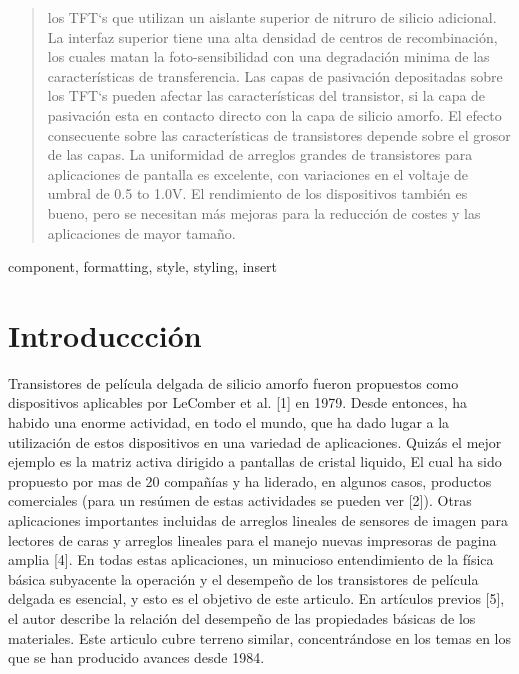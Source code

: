 \documentclass[conference]{IEEEtran}
\begin{document}
\begin{abstract}
    los TFT`s que utilizan un aislante superior de nitruro de silicio adicional.
    La interfaz superior tiene una alta densidad de centros de recombinación,
    los cuales matan la foto-sensibilidad con una degradación minima de las
    características de transferencia. Las capas de pasivación depositadas sobre
    los TFT`s pueden afectar las características del transistor, si la capa
    de pasivación esta en contacto directo con la capa de silicio amorfo. El
    efecto consecuente sobre las características de transistores depende sobre
    el grosor de las capas. La uniformidad de arreglos grandes de transistores
    para aplicaciones de pantalla es excelente, con variaciones en el voltaje
    de umbral de 0.5 to 1.0V. El rendimiento de los dispositivos también es
    bueno, pero se necesitan más mejoras para la reducción de costes y las
    aplicaciones de mayor tamaño.
\end{abstract}

\begin{IEEEkeywords}
component, formatting, style, styling, insert
\end{IEEEkeywords}

\section{Introduccción}
    Transistores de película delgada de silicio amorfo fueron propuestos como dispositivos
    aplicables por LeComber et al. [1] en 1979. Desde entonces, ha
    habido una enorme actividad, en todo el mundo, que ha dado lugar a la utilización 
    de estos dispositivos en una variedad de aplicaciones. Quizás el mejor
    ejemplo es la matriz activa dirigido a pantallas de cristal liquido, El cual ha sido
    propuesto por mas de 20 compañías y ha liderado, en algunos casos, productos
    comerciales (para un resúmen de estas actividades se pueden ver [2]). Otras aplicaciones
    importantes incluidas de arreglos lineales de sensores de imagen para
    lectores de caras y arreglos lineales para el manejo nuevas impresoras de pagina
    amplia [4]. En todas estas aplicaciones, un minucioso entendimiento de la física
    básica subyacente la operación y el desempeño de los transistores de película
    delgada es esencial, y esto es el objetivo de este articulo. En artículos previos
    [5], el autor describe la relación del desempeño de las propiedades básicas de los
    materiales. Este articulo cubre terreno similar, concentrándose en los temas en
    los que se han producido avances desde 1984.
\end{document}
